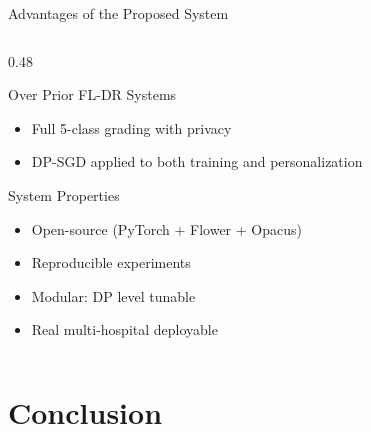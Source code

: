 \documentclass[aspectratio=169, 11pt]{beamer}
\begin{document}
\begin{frame}{Advantages of the Proposed System}
\begin{columns}[T]
\begin{column}{0.48\textwidth}
\begin{exampleblock}{Over Prior FL-DR Systems}
\begin{itemize}
          \item Full 5-class grading with privacy
          \item DP-SGD applied to both training and personalization
        \end{itemize}
      \end{exampleblock}
      \vspace{4pt}
      \begin{block}{System Properties}\small
        \begin{itemize}
          \item Open-source (PyTorch + Flower + Opacus)
          \item Reproducible experiments
          \item Modular: DP level tunable
          \item Real multi-hospital deployable
        \end{itemize}
      \end{block}
    \end{column}
  \end{columns}
\end{frame}

\section{Conclusion}
\end{document}
